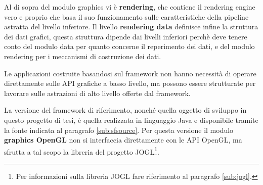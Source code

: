 Al di sopra del modulo graphics vi \`e \textbf{rendering}, che contiene il rendering engine vero e proprio che basa il suo funzionamento sulle caratteristiche della pipeline astratta del livello inferiore.
Il livello \textbf{rendering data} definisce infine la struttura dei dati grafici, questa struttura dipende dai livelli inferiori perch\`e deve tenere conto del modulo data per quanto concerne il reperimento dei dati, e del modulo rendering per i meccanismi di costruzione dei dati.

Le applicazioni costruite basandosi sul framework non hanno necessit\`a di operare direttamente sulle \ac{API} grafiche a basso livello, ma possono essere strutturate per lavorare sulle astrazioni di alto livello offerte dal framework.

La versione del framework di riferimento, nonch\'e quella oggetto di sviluppo in questo progetto di tesi, \`e quella realizzata in linguaggio Java e disponibile tramite la fonte indicata al paragrafo \ref{sub:sfsource}. 
Per questa versione il modulo \textbf{graphics OpenGL} non si interfaccia direttamente con le \ac{API} OpenGL, ma sfrutta a tal scopo la libreria del progetto JOGL\footnote{Per informazioni sulla libreria JOGL fare riferimento al paragrafo \ref{sub:jogl}.}.

